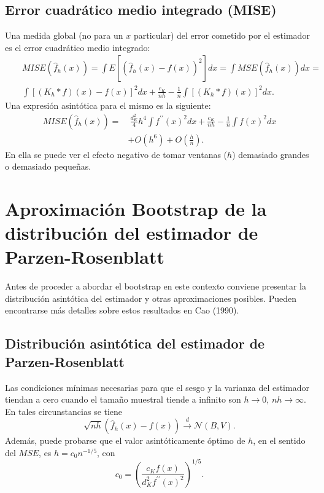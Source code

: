 \documentclass[]{book}
\theoremstyle{break}
\theoremstyle{definition}
\theoremstyle{definition}
\theoremstyle{definition}
\theoremstyle{remark}
\begin{document}
\subsection{Error cuadrático medio integrado
(MISE)}\label{error-cuadruxe1tico-medio-integrado-mise}

Una medida global (no para un \(x\) particular) del error cometido por
el estimador es el error cuadrático medio integrado: \[\begin{aligned}
& & MISE\left( \hat{f}_{h}\left( x \right) \right) =\int E\left[ \left( \hat{f}
_{h}\left( x \right) -f\left( x \right) \right)^2\right] dx=\int MSE\left( 
\hat{f}_{h}\left( x \right) \right) dx= \\
&&\int \left[ \left( K_{h}\ast f \right) \left( x \right) -f\left( x \right) 
\right]^2dx+\frac{c_{K}}{nh}-\frac{1}{n}\int \left[ \left( K_{h}\ast
f \right) \left( x \right) \right]^2dx.
\end{aligned}\] Una expresión asintótica para el mismo es la siguiente:
\[\begin{aligned}
MISE\left( \hat{f}_{h}\left( x \right) \right) =&\ \frac{d_{K}^2}{4}h^4\int
f^{\prime \prime }\left( x \right)^2dx+\frac{c_{K}}{nh}-\frac{1}{n}\int
f\left( x \right)^2dx \\
&+O\left( h^{6} \right) +O \left( \frac{h}{n} \right).
\end{aligned}\] En ella se puede ver el efecto negativo de tomar
ventanas (\(h\)) demasiado grandes o demasiado pequeñas.

\section{Aproximación Bootstrap de la distribución del estimador de
Parzen-Rosenblatt}\label{aproximacion-bootstrap}

Antes de proceder a abordar el bootstrap en este contexto conviene
presentar la distribución asintótica del estimador y otras
aproximaciones posibles. Pueden encontrarse más detalles sobre estos
resultados en Cao (1990).

\subsection{Distribución asintótica del estimador de
Parzen-Rosenblatt}\label{distribuciuxf3n-asintuxf3tica-del-estimador-de-parzen-rosenblatt}

Las condiciones mínimas necesarias para que el sesgo y la varianza del
estimador tiendan a cero cuando el tamaño muestral tiende a infinito son
\(h\rightarrow 0\), \(nh\rightarrow \infty\). En tales circunstancias se
tiene
\[\sqrt{nh}\left( \hat{f}_{h}\left( x \right) -f\left( x \right) \right) \overset
{d}{\rightarrow }\mathcal{N}\left( B,V \right) \text{.}\]Además, puede
probarse que el valor asintóticamente óptimo de \(h\), en el sentido del
\(MSE\), es \(h=c_{0}n^{-1/5}\), con
\[c_{0}=\left( \frac{c_{K}f\left( x \right)}{d_{K}^2f^{\prime \prime }\left(
x \right)^2} \right)^{1/5}.\]
\end{document}
